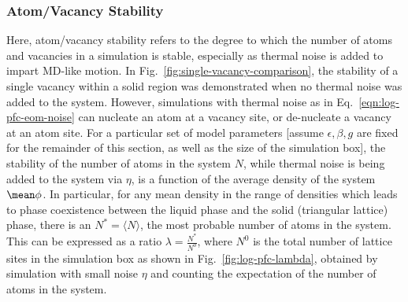 \subsubsection{Atom/Vacancy Stability}

Here, atom/vacancy stability refers to the degree to which the number of atoms and vacancies in a simulation is stable, especially as thermal noise is added to impart MD-like motion.  In Fig.~\ref{fig:single-vacancy-comparison}, the stability of a single vacancy within a solid region was demonstrated when no thermal noise was added to the system.  However, simulations with thermal noise as in Eq.~\ref{eqn:log-pfc-eom-noise} can nucleate an atom at a vacancy site, or de-nucleate a vacancy at an atom site.  For a particular set of model parameters [assume $\epsilon, \beta, g$ are fixed for the remainder of this section, as well as the size of the simulation box], the stability of the number of atoms in the system $N$, while thermal noise is being added to the system via $\eta$, is a function of the average density of the system $\mean\phi$.  In particular, for any mean density in the range of densities which leads to phase coexistence between the liquid phase and the solid (triangular lattice) phase, there is an $N^* = \langle N \rangle$, the most probable number of atoms in the system.  This can be expressed as a ratio $\lambda = \frac{N^*}{N^0}$, where $N^0$ is the total number of lattice sites in the simulation box as shown in Fig.~\ref{fig:log-pfc-lambda}, obtained by simulation with small noise $\eta$ and counting the expectation of the number of atoms in the system.

